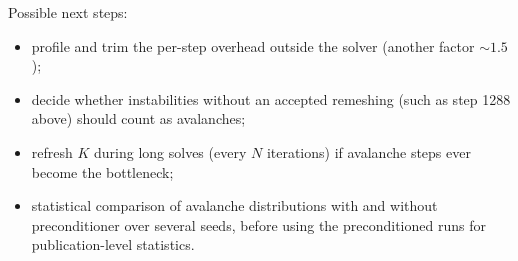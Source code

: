 \documentclass[11pt,a4paper]{article}
\theoremstyle{remark}
\begin{document}
Possible next steps:
\begin{itemize}[leftmargin=*]
\item profile and trim the per-step overhead outside the solver (another factor $\sim1.5$);
\item decide whether instabilities without an accepted remeshing (such as step 1288 above)
should count as avalanches;
\item refresh $K$ during long solves (every $N$ iterations) if avalanche steps ever become the
bottleneck;
\item statistical comparison of avalanche distributions with and without preconditioner over
several seeds, before using the preconditioned runs for publication-level statistics.
\end{itemize}

\end{document}
